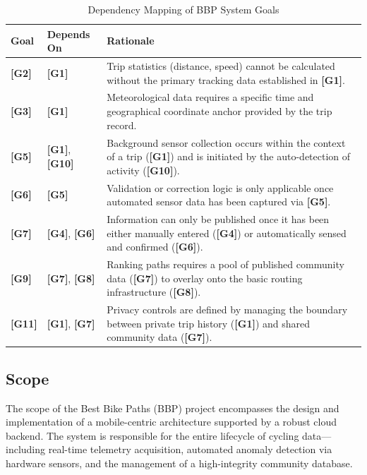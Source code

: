 \begin{table}[H]
    \centering
    \begin{tabular}{|l|l|p{8cm}|}
        \hline
        \textbf{Goal} & \textbf{Depends On} & \textbf{Rationale} \\ \hline
        \textbf{[G2]} & \textbf{[G1]} & Trip statistics (distance, speed) cannot be calculated without the primary tracking data established in \textbf{[G1]}. \\ \hline
        \textbf{[G3]} & \textbf{[G1]} & Meteorological data requires a specific time and geographical coordinate anchor provided by the trip record. \\ \hline
        \textbf{[G5]} & \textbf{[G1]}, \textbf{[G10]} & Background sensor collection occurs within the context of a trip (\textbf{[G1]}) and is initiated by the auto-detection of activity (\textbf{[G10]}). \\ \hline
        \textbf{[G6]} & \textbf{[G5]} & Validation or correction logic is only applicable once automated sensor data has been captured via \textbf{[G5]}. \\ \hline
        \textbf{[G7]} & \textbf{[G4]}, \textbf{[G6]} & Information can only be published once it has been either manually entered (\textbf{[G4]}) or automatically sensed and confirmed (\textbf{[G6]}). \\ \hline
        \textbf{[G9]} & \textbf{[G7]}, \textbf{[G8]} & Ranking paths requires a pool of published community data (\textbf{[G7]}) to overlay onto the basic routing infrastructure (\textbf{[G8]}). \\ \hline
        \textbf{[G11]} & \textbf{[G1]}, \textbf{[G7]} & Privacy controls are defined by managing the boundary between private trip history (\textbf{[G1]}) and shared community data (\textbf{[G7]}). \\ \hline
    \end{tabular}
    \caption{Dependency Mapping of BBP System Goals}
    \label{tab:goal_dependencies}
\end{table}

\subsection{Scope}
The scope of the Best Bike Paths (BBP) project encompasses the design and implementation of a mobile-centric architecture supported by a robust cloud backend. The system is responsible for the entire lifecycle of cycling data—including real-time telemetry acquisition, automated anomaly detection via hardware sensors, and the management of a high-integrity community database.

